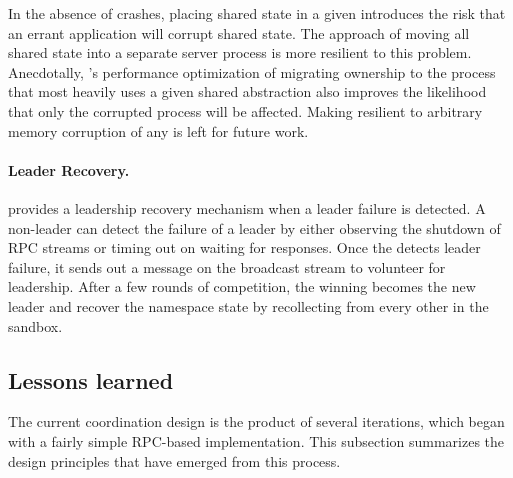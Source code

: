 In the absence of crashes, placing shared state in a given \picoproc{} introduces the risk that an errant 
application will corrupt shared \libos{} state.  The \microkernel{} approach of 
moving all shared state into a separate server process is more resilient to this problem.
Anecdotally, \graphene{}'s performance optimization of migrating ownership to the process that 
most heavily uses a given shared abstraction also improves the likelihood that only the corrupted
process will be affected.  
Making \graphene{} resilient to arbitrary memory corruption of any \picoproc{} is left for future work.


\paragraph{Leader Recovery.}
\graphene{} provides a leadership recovery mechanism when a leader failure is detected.
A non-leader \picoproc{} can detect the failure of a leader by either observing the shutdown of RPC streams or timing out on waiting for responses. 
Once the \picoproc{} detects leader failure, it sends out a message on the broadcast stream to volunteer for leadership.
After a few rounds of competition, the winning \picoproc{} becomes the new leader and recover the namespace state by recollecting from every other \picoproc{} in the sandbox.



\subsection{Lessons learned}
\label{sec:libos:namespaces:insights}

The current coordination design is the product of several iterations, which began 
with a fairly simple RPC-based implementation. %
This subsection summarizes the design principles that have emerged from this process.

